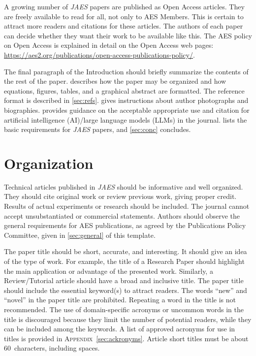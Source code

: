 \documentclass[fleqn]{jaes}
\begin{document}
A growing number of \emph{JAES} papers are published as Open Access articles. They are freely available to read for all, not only to AES Members. This is certain to attract more readers and citations for these articles. The authors of each paper can decide whether they want their work to be available like this. The AES policy on Open Access is explained in detail on the Open Access web pages: \url{https://aes2.org/publications/open-access-publications-policy/}.

The final paragraph of the Introduction should briefly summarize the contents of the rest of the paper.  describes how the paper may be organized and how equations, figures, tables, and a graphical abstract are formatted. The reference format is described in \cref{sec:refs}.  gives instructions about author photographs and biographies.  provides guidance on the acceptable appropriate use and citation for artificial intelligence (AI)/large language models (LLMs) in the journal.  lists the basic requirements for \emph{JAES} papers, and \cref{sec:conc} concludes. 

\section{Organization}{\label{sec:org}}

Technical articles published in \emph{JAES} should be informative and well organized. They should cite original work or review previous work, giving proper credit. Results of actual experiments or research should be included. The journal cannot accept unsubstantiated or commercial statements. Authors should observe the general requirements for AES publications, as agreed by the Publications Policy Committee, given in \cref{sec:general} of this template.

The paper title should be short, accurate, and interesting. It should give an idea of the type of work. For example, the title of a Research Paper should highlight the main application or advantage of the presented work. Similarly, a Review/Tutorial article should have a broad and inclusive title. The paper title should include the essential keyword(s) to attract readers. The words “new” and “novel” in the paper title are prohibited. Repeating a word in the title is not recommended.
The use of domain-specific acronyms or uncommon words in the title is discouraged because they limit the number of potential readers, while they can be included among the keywords. A list of approved acronyms for use in titles is provided in \textsc{Appendix}~\ref{sec:ackronyms}. Article short titles must be about 60~characters, including spaces.
\end{document}
